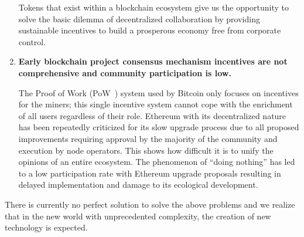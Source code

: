 \begin{enumerate}
	Tokens that exist within a blockchain ecosystem give us the opportunity to solve the basic dilemma of decentralized collaboration by providing sustainable incentives to build a prosperous economy free from corporate control.

	\item

	\textbf{Early blockchain project consensus mechanism incentives are not comprehensive and community participation is low.}

	The Proof of Work (PoW~\cite{pow}) system used by Bitcoin only focuses on incentives for the miners; this single incentive system cannot cope with the enrichment of all users regardless of their role. Ethereum with its decentralized nature has been repeatedly criticized for its slow upgrade process due to all proposed improvements requiring approval by the majority of the community and execution by node operators. This shows how difficult it is to unify the opinions of an entire ecosystem. The phenomenon of “doing nothing” has led to a low participation rate with Ethereum upgrade proposals resulting in delayed implementation and damage to its ecological development.

\end{enumerate}

There is currently no perfect solution to solve the above problems and we realize that in the new world with unprecedented complexity, the creation of new technology is expected.
